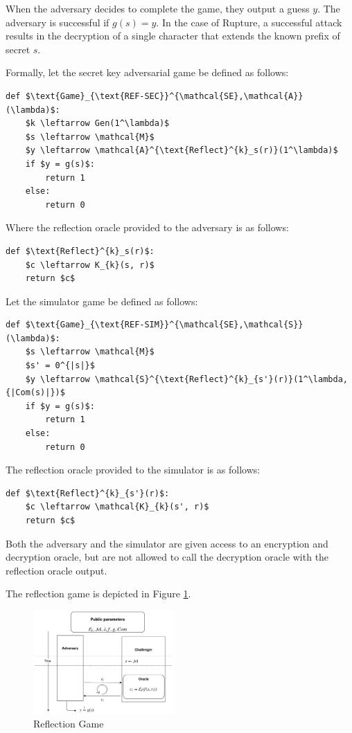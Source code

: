 When the adversary decides to complete the game, they output a guess $y$. The
adversary is successful if $g(s) = y$. In the case of Rupture, a successful
attack results in the decryption of a single character that extends the known
prefix of secret $s$.

Formally, let the secret key adversarial game be defined as follows:

\begin{lstlisting}[texcl,mathescape,basicstyle=\small]
def $\text{Game}_{\text{REF-SEC}}^{\mathcal{SE},\mathcal{A}}(\lambda)$:
    $k \leftarrow Gen(1^\lambda)$
    $s \leftarrow \mathcal{M}$
    $y \leftarrow \mathcal{A}^{\text{Reflect}^{k}_s(r)}(1^\lambda)$
    if $y = g(s)$:
        return 1
    else:
        return 0
\end{lstlisting}

Where the reflection oracle provided to the adversary is as follows:

\begin{lstlisting}[texcl,mathescape,basicstyle=\small]
def $\text{Reflect}^{k}_s(r)$:
    $c \leftarrow K_{k}(s, r)$
    return $c$
\end{lstlisting}

Let the simulator game be defined as follows:

\begin{lstlisting}[texcl,mathescape,basicstyle=\small]
def $\text{Game}_{\text{REF-SIM}}^{\mathcal{SE},\mathcal{S}}(\lambda)$:
    $s \leftarrow \mathcal{M}$
    $s' = 0^{|s|}$
    $y \leftarrow \mathcal{S}^{\text{Reflect}^{k}_{s'}(r)}(1^\lambda, {|Com(s)|})$
    if $y = g(s)$:
        return 1
    else:
        return 0
\end{lstlisting}

The reflection oracle provided to the simulator is as follows:

\begin{lstlisting}[texcl,mathescape,basicstyle=\small]
def $\text{Reflect}^{k}_{s'}(r)$:
    $c \leftarrow \mathcal{K}_{k}(s', r)$
    return $c$
\end{lstlisting}

Both the adversary and the simulator are given access to an encryption and decryption oracle, but
are not allowed to call the decryption oracle with the reflection oracle output.

The reflection game is depicted in Figure \ref{fig:refgame}.

    \begin{figure}[thpb]
        \centering
            \includegraphics[width=0.48\textwidth]{figures/reflection_game.png}
        \caption{Reflection Game}
        \label{fig:refgame}
    \end{figure}

